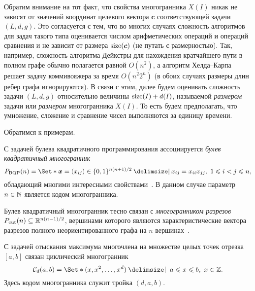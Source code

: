 \begin{remark}
\label{def:Psize}
Обратим внимание на тот факт, что свойства многогранника $X(I)$ никак не зависят от значений координат целевого вектора $\bm{c}$ соответствующей задачи $(L, d, g)$.
Это согласуется с тем, что во многих случаях сложность алгоритмов для задач такого типа оценивается числом арифметических операций и операций сравнения и не зависит от размера $\operatorname{size}(\bm{c})$ (не путать с размерностью). Так, например, сложность алгоритма Дейкстры для нахождения кратчайшего пути в полном графе обычно полагается равной $O(n^2)$, а алгоритм Хелда--Карпа решает задачу коммивояжера за время $O(n^2 2^n)$ (в обоих случаях размеры длин ребер графа игнорируются). В связи с этим, далее будем оценивать сложность задачи $(L, d, g)$ относительно величины $\operatorname{size}(I) + d(I)$, называемой \emph{размером} задачи или \emph{размером} многогранника $X(I)$. То есть будем предполагать, что умножение, сложение и сравнение чисел выполняются за единицу времени.
\end{remark}

Обратимся к примерам.

С задачей булева квадратичного программирования ассоциируется \emph{булев квадратичный многогранник}
\begin{equation}
\label{eq:BQP}
\BQP(n) = \Set*{\bm{x}=(x_{ij}) \in \{0, 1\}^{n(n+1)/2} \given x_{ij} = x_{ii} x_{jj}, \ 1 \le i < j \le n},
\end{equation}
обладающий многими интересными свойствами~\cite{Deza:2001}.
В данном случае параметр $n \in \mathbb{N}$ является кодом многогранника.

Булев квадратичный многогранник тесно связан с \emph{многогранником разрезов}{\label{def:CutPolytope}} $P_{\textup{cut}}(n) \subseteq \mathbb{R}^{n(n-1)/2}$, вершинами которого являются характеристические вектора разрезов полного неориентированного графа на $n$ вершинах~\cite{Deza:2001}.

С задачей отыскания максимума многочлена на множестве целых точек отрезка $[a, b]$ связан циклический многогранник
\begin{equation}
\label{eq:Cyclic}
\CP_d(a,b) = \Set*{(x, x^2, \dots, x^d) \given \ a \le x \le b, \ x\in \Z}.
\end{equation}
Здесь кодом многогранника служит тройка $(d,a,b)$.

